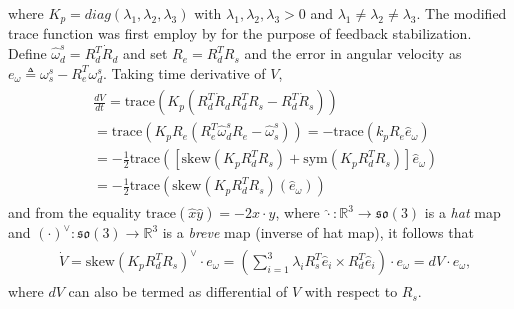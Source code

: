 \documentclass{ifacconf}
\begin{document}
where $K_{p} = diag(\lambda_{1},\lambda_{2},\lambda_{3})$ with $\lambda_{1},\lambda_{2},\lambda_{3}>0$ and $\lambda_{1} \neq \lambda_{2} \neq \lambda_{3}$. The modified trace function was first employ by \citep{chillingworth_marsden_wan} for the purpose of feedback stabilization. Define $\widehat{\omega}_{d}^{s} = R_{d}^{T}\dot{R}_{d}$ and set $R_{e} = R_{d}^{T}R_{s}$ and the error in angular velocity as $e_{\omega} \triangleq \omega_{s}^{s} - R_{e}^{T}\omega_{d}^{s}$. Taking time derivative of $V$,
\begin{align}\nonumber
\begin{split}
& \frac{d V}{dt}  =\mbox{trace}( K_{p}(R_{d}^{T}\dot{R}_{d}R_{d}^{T}R_{s} -  R_{d}^{T} \dot{R}_{s})) \\
& = \mbox{trace}( K_{p} R_{e}(R_{e}^{T} \widehat{\omega}_{d}^{s}R_{e} - \widehat{\omega}_{s}^{s})) = - \mbox{trace}(k_{p}R_{e}\widehat{e}_{\omega})\\
& = - \frac{1}{2} \mbox{trace}([\mbox{skew}(K_{p}R_{d}^{T}R_{s}) + \mbox{sym}(K_{p}R_{d}^{T}R_{s})] \widehat{e}_{\omega})\\
&  = - \frac{1}{2} \mbox{trace}(\mbox{skew}(K_{p}R_{d}^{T}R_{s}) (\widehat{e}_{\omega}))
\end{split}
\end{align}
and from the equality $\mbox{trace}(\widehat{x}\widehat{y}) = - 2 x \cdot y $, where $\widehat{\cdot} : \mathbb{R}^{3} \longrightarrow \mathfrak{so}(3)$ is a \textit{hat} map and $(\cdot)^{\vee} : \mathfrak{so}(3)\longrightarrow \mathbb{R}^{3}$ is a \textit{breve} map (inverse of hat map), it follows that
\begin{align}\nonumber
\begin{split}
 & \dot{V}  =  \mbox{skew}(K_{p}R_{d}^{T}R_{s})^{\vee} \cdot e_{\omega} = (\sum_{i = 1}^{3} \lambda_{i} R_{s}^{T}\hat{e}_{i} \times R_{d}^{T}\hat{e}_{i})\cdot e_{\omega} = dV \cdot e_{\omega},
\end{split}
\end{align} 
where $dV$ can also be termed as differential of $V$ with respect to $R_{s}$.
\end{document}
